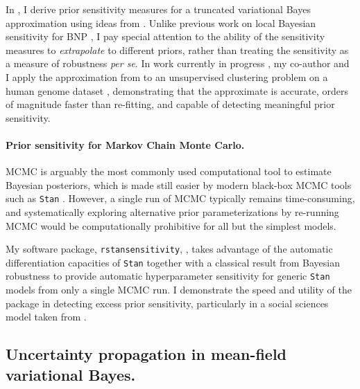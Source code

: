 In \citep{giordano:2018:bnpsensitivity}, I derive prior sensitivity measures for
a truncated variational Bayes approximation using ideas from
\citep{gustafson:1996:localposterior, giordano:2018:covariances}. Unlike
previous work on local Bayesian sensitivity for BNP
\citep{Basu:2000:BNP_robustness}, I pay special attention to the ability of the
sensitivity measures to \emph{extrapolate} to different priors, rather than
treating the sensitivity as a measure of robustness \textit{per se}. In work
currently in progress \citep{liu:2020:bnpjisba}, my co-author and I apply the
approximation from \citep{giordano:2018:bnpsensitivity} to an unsupervised
clustering problem on a human genome dataset \citep{huang:2011:haplotype,
raj:2014:faststructure}, demonstrating that the approximate is accurate, orders
of magnitude faster than re-fitting, and capable of detecting meaningful prior
sensitivity.



\paragraph{Prior sensitivity for Markov Chain Monte Carlo.}

MCMC is arguably the most commonly used computational tool to estimate Bayesian
posteriors, which is made still easier by modern black-box MCMC tools such as
\texttt{Stan} \citep{carpenter:2017:stan, rstan}.  However, a single run of MCMC
typically remains time-consuming, and systematically exploring alternative prior
parameterizations by re-running MCMC would be computationally prohibitive for
all but the simplest models.

My software package, \texttt{rstansensitivity},
\citep{giordano:2020:rstansensitivity, giordano:2018:mcmchyper}, takes advantage
of the automatic differentiation capacities of \texttt{Stan}
\citep{carpenter:2015:stanmath} together with a classical result from  Bayesian
robustness \citep{gustafson:1996:localposterior, basu:1996:local,
giordano:2018:covariances} to provide automatic hyperparameter sensitivity for
generic \texttt{Stan} models from only a single MCMC run.  I demonstrate the
speed and utility of the package in detecting excess prior sensitivity,
particularly in a social sciences model taken from \citet[Chapter
13.5]{gelman:2006:arm}.


\subsection*{Uncertainty propagation in mean-field variational Bayes.}

